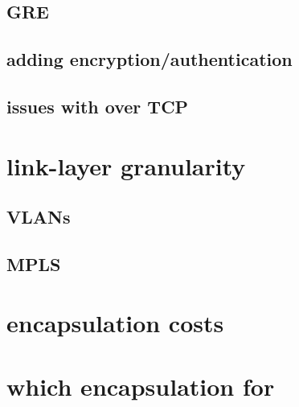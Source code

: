 


\subsection{GRE}




\subsection{adding encryption/authentication}


\subsection{issues with over TCP}


\section{link-layer granularity}


\subsection{VLANs}



\subsection{MPLS}



\section{encapsulation costs}


\section{which encapsulation for}


